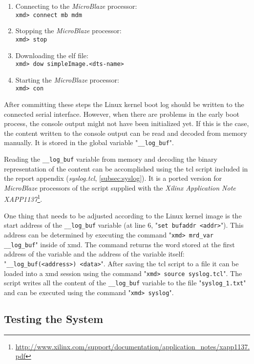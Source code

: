 \begin{enumerate}
  \setlength{\itemsep}{1pt}
  \setlength{\parskip}{2pt}
  \setlength{\parsep}{0pt}
\item Connecting to the \textit{MicroBlaze} processor:\\ \texttt{xmd> connect mb mdm}
\item Stopping the \textit{MicroBlaze} processor:\\ \texttt{xmd> stop}
\item Downloading the \gls{elf} file:\\ \texttt{xmd> dow simpleImage.<dts-name>}
\item Starting the \textit{MicroBlaze} processor:\\ \texttt{xmd> con}
\end{enumerate}

After committing these steps the Linux kernel boot log should be written to the connected serial interface. However, when there are problems in the early boot process, the console output might not have been initialized yet. If this is the case, the content written to the console output can be read and decoded from memory manually. It is stored in the global variable "\texttt{\_\_log\_buf}".

Reading the \texttt{\_\_log\_buf} variable from memory and decoding the binary representation of the content can be accomplished using the \gls{tcl} script included in the report appendix (\textit{syslog.tcl}, \ref{subsec:syslog}). It is a ported version for \textit{MicroBlaze} processors of the script supplied with the \textit{Xilinx Application Note XAPP1137}\footnote{\url{http://www.xilinx.com/support/documentation/application\_notes/xapp1137.pdf}}. 

One thing that needs to be adjusted according to the Linux kernel image is the start address of the \texttt{\_\_log\_buf} variable (at line 6, "\texttt{set bufaddr <addr>}"). This address can be determined by executing the command "\texttt{xmd> mrd\_var \_\_log\_buf}" inside of \gls{xmd}. The command returns the word stored at the first address of the variable and the address of the variable itself: "\texttt{\_\_log\_buf(<address>)   <data>}". After saving the \gls{tcl} script to a file it can be loaded into a \gls{xmd} session using the command "\texttt{xmd> source syslog.tcl}". The script writes all the content of the \texttt{\_\_log\_buf} variable to the file "\texttt{syslog\_1.txt}" and can be executed using the command "\texttt{xmd> syslog}".

\subsection{Testing the System}


